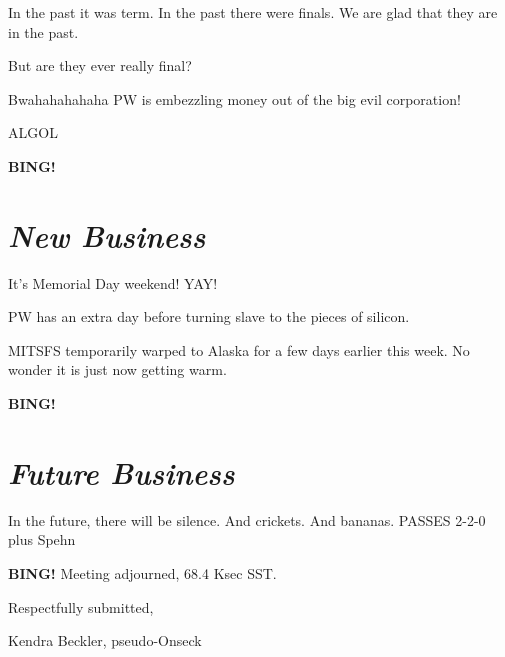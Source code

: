 \documentclass[10pt]{article}
\newcommand{\bing}{{\bf BING!} }
\newcommand{\goto}[1]{\bing \vskip 12pt \section*{{\em{#1}}}}
\newcommand{\ps}{ plus Spehn\xspace}
\newcommand{\onseck}{Kendra Beckler, pseudo-Onseck}
\begin{document}
In the past it was term.  In the past there were finals.  We are glad that they are in the past.

But are they ever really final?

Bwahahahahaha PW is embezzling money out of the big evil corporation!

ALGOL

\goto{New Business}

It's Memorial Day weekend!  YAY!

PW has an extra day before turning slave to the pieces of silicon.

MITSFS temporarily warped to Alaska for a few days earlier this week.  No wonder it is just now getting warm.

\goto{Future Business}

In the future, there will be silence.  And crickets.  And bananas.  PASSES 2-2-0 \ps

\bing
\noindent
Meeting adjourned, 68.4 Ksec SST.

\vspace{18pt}

\centerline{Respectfully submitted,}
\centerline{\onseck}
\end{document}
